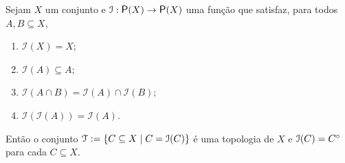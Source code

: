 \begin{proposition}
	Sejam $X$ um conjunto e $\mathcal I: \p(X) \to \p(X)$ uma função que satisfaz, para todos $A,B \subseteq X$,
	\begin{enumerate}
	\item $\mathcal I(X) = X$;
	\item $\mathcal I(A) \subseteq A$;
	\item $\mathcal I(A \cap B) = \mathcal I(A) \cap \mathcal I(B)$;
	\item $\mathcal I(\mathcal I(A)) = \mathcal I(A)$.
	\end{enumerate}
	
Então o conjunto $\mathcal{T} := \left\{{C \subseteq X}\;\middle\vert\;{C = \mathcal I(C)}\right\}$ é uma topologia de $X$ e $\mathcal I(C) = {C}^\circ$ para cada $C \subseteq X$.
\end{proposition}
